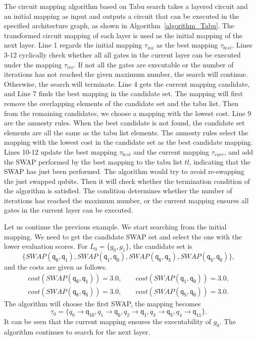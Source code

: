 \documentclass[runningheads]{llncs}
\begin{document}
	The circuit mapping algorithm based on Tabu search takes a layered circuit and an initial mapping as input and outputs a circuit that can be executed in the specified architecture graph, as shown in Algorithm~\ref{algorithm_Tabu}. The transformed circuit mapping of each layer is used as the initial mapping of the next layer. 
	Line 1 regards the initial mapping $\tau_{ini}$ as the best mapping $\tau_{best}$. Lines 3-12 cyclically check whether all all gates in the current layer can be executed under the mapping $\tau_{ini}$. If not all the gates are executable or the number of iterations has not reached the given maximum number, the search will continue. Otherwise, the search will terminate. Line 4 gets the current mapping candidate, and Line 7 finds the best mapping in the candidate set. The mapping will first remove the overlapping elements of the candidate set and the tabu list. Then from the remaining candidates, we choose a mapping with the lowest cost. Line 9 are the amnesty rules. When the best candidate is not found, the candidate set elements are all the same as the tabu list elements. The amnesty rules select the mapping with the lowest cost in the candidate set as the best candidate mapping. Lines 10-12 update the best mapping $\tau_{best}$ and the current mapping $\tau_{curr}$, and add the SWAP performed by the best mapping to the tabu list $tl$, indicating that the SWAP has just been performed. 
	The algorithm would try to avoid re-swapping the just swapped qubits. Then it will check whether the termination condition of the algorithm is satisfied. The condition determines whether the number of iterations has reached the maximum number, or the current mapping ensures all gates in the current layer can be executed. 
\begin{example}
Let us continue the previous example. We start searching from the initial mapping. We need to get the candidate SWAP set and select the one with the lower evaluation scores.
For $L_{0}=\{g_{0},g_{1}\}$, the candidate set is 
$$\{SWAP(\textsf{q}_\textsf{6},\textsf{q}_\textsf{1}), SWAP(\textsf{q}_\textsf{1},\textsf{q}_\textsf{0}), SWAP(\textsf{q}_\textsf{6},\textsf{q}_\textsf{5}), SWAP(\textsf{q}_\textsf{5},\textsf{q}_\textsf{0}) \} , $$ and the costs are given as follows.
\[\begin{array}{l}
cost(SWAP(\textsf{q}_\textsf{6},\textsf{q}_\textsf{1}))=3.0, \qquad cost(SWAP(\textsf{q}_\textsf{1},\textsf{q}_\textsf{0}))=3.0,\\ cost(SWAP(\textsf{q}_\textsf{6},\textsf{q}_\textsf{5}))=3.0, \qquad cost(SWAP(\textsf{q}_\textsf{5},\textsf{q}_\textsf{0}))=3.0 .
\end{array}\]
The algorithm will choose the first SWAP, the mapping becomes $$\tau_{0}=\{\textit{q}_\textit{0}\rightarrow  \textsf{q}_\textsf{10},\textit{q}_\textit{1}\rightarrow  \textsf{q}_\textsf{0},
\textit{q}_\textit{2}\rightarrow  \textsf{q}_\textsf{1},\textit{q}_\textit{3}\rightarrow  \textsf{q}_\textsf{5},\textit{q}_\textit{4}\rightarrow  \textsf{q}_\textsf{11}\} . $$ 
 It can be seen that the current mapping ensures the executability of $g_{0}$. The algorithm continues to search for the next layer.
\end{example}
\end{document}
